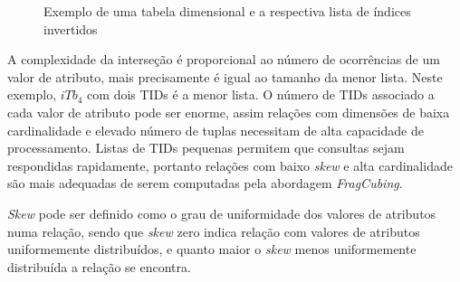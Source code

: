 {\begin{figure}[!htb]
	\caption{Exemplo de uma tabela dimensional e a respectiva lista de índices invertidos}\label{fig:fragexample}
	\vspace{2mm}
	\begin{center}
	\end{center}
	\vspace{1mm}
	\legenda{}
\end{figure}

A complexidade da interseção é proporcional ao número de ocorrências de um valor de atributo, mais precisamente é igual ao tamanho da menor lista.
Neste exemplo, $iTb_4$ com dois TIDs é a menor lista.
O número de TIDs associado a cada valor de atributo pode ser enorme, assim relações com dimensões de baixa cardinalidade e elevado número de tuplas necessitam de alta capacidade de processamento.
Listas de TIDs pequenas permitem que consultas sejam respondidas rapidamente, portanto relações com baixo \textit{skew} e alta cardinalidade são mais adequadas de serem computadas pela abordagem \textit{FragCubing}.

\textit{Skew} pode ser definido como o grau de uniformidade dos valores de atributos numa relação, sendo que \textit{skew} zero indica relação com valores de atributos uniformemente distribuídos, e quanto maior o \textit{skew} menos uniformemente distribuída a relação se encontra.

}
